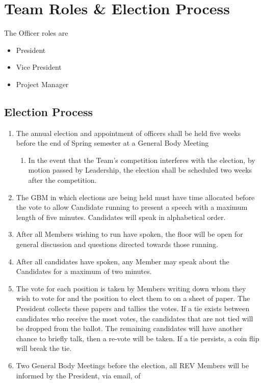 \section{Team Roles \& Election Process}
\label{roles}
The Officer roles are
\begin{itemize}
\item President
\item Vice President
\item Project Manager
\end{itemize}

\subsection{Election Process}
\label{roles:process}
\begin{enumerate}
\item The annual election and appointment of officers shall be held five weeks before the end of Spring semester at a General Body Meeting
    \begin{enumerate}
    \item  In the event that the Team's competition interferes with the election, by motion passed by Leadership, the election shall be scheduled two weeks after the competition.
    \end{enumerate}
\item The GBM in which elections are being held must have time allocated before the vote to allow Candidate running to present a speech with a maximum length of five minutes. Candidates will speak in alphabetical order.
\item After all Members wishing to run have spoken, the floor will be open for general discussion and questions directed towards those running.
\item After all candidates have spoken, any Member may speak about the Candidates for a maximum of two minutes.
\item The vote for each position is taken by Members writing down whom they wish to vote for and the position to elect them to on a sheet of paper. The President collects these papers and tallies the votes. If a tie exists between candidates who receive the most votes, the candidates that are not tied will be dropped from the ballot. The remaining candidates will have another chance to briefly talk, then a re-vote will be taken. If a tie persists, a coin flip will break the tie. 
\item Two General Body Meetings before the election, all REV Members will be informed by the President, via email, of

\end{enumerate}
